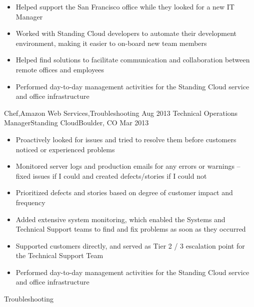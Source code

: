 \begin{experiences}
{\begin{itemize}
                        \item Helped support the San Francisco office while they looked for a new IT Manager
                        \item Worked with Standing Cloud developers to automate their development environment, making it easier to on-board new team members
                        \item Helped find solutions to facilitate communication and collaboration between remote offices and employees
                        \item Performed day-to-day management activities for the Standing Cloud service and office infrastructure
                      \end{itemize}
                    }
                    {Chef,Amazon Web Services,Troubleshooting}
  \emptySeparator
  \experience
    {Aug 2013}      {Technical Operations Manager}{Standing Cloud}{Boulder, CO}
    {Mar 2013}      {
                      \begin{itemize}
                        \item Proactively looked for issues and tried to resolve them before customers noticed or experienced problems
                        \item Monitored server logs and production emails for any errors or warnings -- fixed issues if I could and created defects/stories if I could not
                        \item Prioritized defects and stories based on degree of customer impact and frequency
                        \item Added extensive system monitoring, which enabled the Systems and Technical Support teams to find and fix problems as soon as they occurred
                        \item Supported customers directly, and served as Tier 2 / 3 escalation point for the Technical Support Team
                        \item Performed day-to-day management activities for the Standing Cloud service and office infrastructure
                      \end{itemize}
                    }
                    {Troubleshooting}

\end{experiences}
